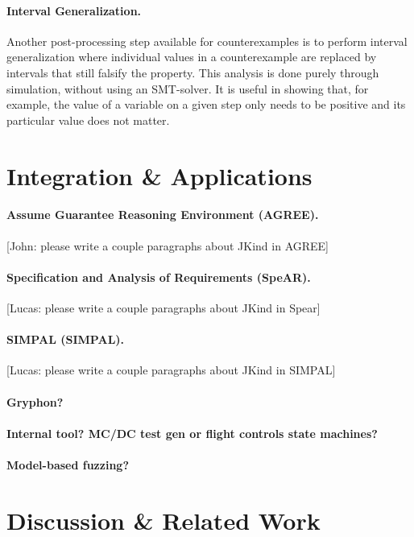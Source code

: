 \documentclass{llncs}
\begin{document}
\paragraph{Interval Generalization.} Another post-processing step
available for counterexamples is to perform interval generalization
where individual values in a counterexample are replaced by intervals
that still falsify the property. This analysis is done purely through
simulation, without using an SMT-solver. It is useful in showing
that, for example, the value of a variable on a given step only needs
to be positive and its particular value does not matter.

\section{Integration \& Applications}


\paragraph{Assume Guarantee Reasoning Environment (AGREE). } [John:
please write a couple paragraphs about JKind in AGREE]

\paragraph{Specification and Analysis of Requirements (SpeAR).}
[Lucas: please write a couple paragraphs about JKind in Spear]

 \paragraph{SIMPAL (SIMPAL).}
[Lucas: please write a couple paragraphs about JKind in SIMPAL]

\paragraph{Gryphon?}

\paragraph{Internal tool? MC/DC test gen or flight controls state
  machines?}

\paragraph{Model-based fuzzing?}

\section{Discussion \& Related Work}
\end{document}

